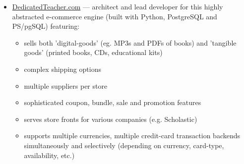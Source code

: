 \documentclass[line,margin,hidelinks]{res}
\begin{document}
\begin{resume}
\begin{position}
\begin{itemize}
\item \href{https://web.archive.org/web/20130302232056/http://www.dedicatedteacher.com/}{DedicatedTeacher.com}
  --- architect and lead developer for this highly abstracted e-commerce engine
  (built with Python, PostgreSQL and PS/pgSQL) featuring:
    \begin{itemize}
      \item sells both 'digital-goods' (eg. MP3s and PDFs of books)
      and 'tangible goods' (printed books, CDs, educational kits)
      \item complex shipping options
      \item multiple suppliers per store
      \item sophisticated coupon, bundle, sale and promotion features
      \item serves store fronts for various companies
      (e.g. Scholastic)
      \item supports multiple currencies, multiple credit-card
      transaction backends simultaneously and selectively
      (depending on currency, card-type, availability, etc.)
    \end{itemize}


\end{itemize}
\end{position}
\end{resume}
\end{document}

